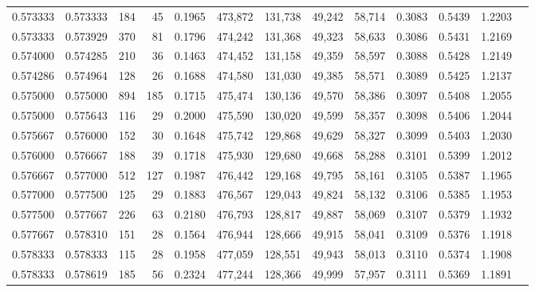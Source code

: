 \begin{tabular}{rrrrrrrrrrrrr}
0.573333 & 0.573333 &   184 &  45 &                                     0.1965 & 473,872 & 131,738 &  49,242 &  58,714 & 0.3083 & 0.5439 & 1.2203 \\
0.573333 & 0.573929 &   370 &  81 &                                     0.1796 & 474,242 & 131,368 &  49,323 &  58,633 & 0.3086 & 0.5431 & 1.2169 \\
0.574000 & 0.574285 &   210 &  36 &                                     0.1463 & 474,452 & 131,158 &  49,359 &  58,597 & 0.3088 & 0.5428 & 1.2149 \\
0.574286 & 0.574964 &   128 &  26 &                                     0.1688 & 474,580 & 131,030 &  49,385 &  58,571 & 0.3089 & 0.5425 & 1.2137 \\
0.575000 & 0.575000 &   894 & 185 &                                     0.1715 & 475,474 & 130,136 &  49,570 &  58,386 & 0.3097 & 0.5408 & 1.2055 \\
0.575000 & 0.575643 &   116 &  29 &                                     0.2000 & 475,590 & 130,020 &  49,599 &  58,357 & 0.3098 & 0.5406 & 1.2044 \\
0.575667 & 0.576000 &   152 &  30 &                                     0.1648 & 475,742 & 129,868 &  49,629 &  58,327 & 0.3099 & 0.5403 & 1.2030 \\
0.576000 & 0.576667 &   188 &  39 &                                     0.1718 & 475,930 & 129,680 &  49,668 &  58,288 & 0.3101 & 0.5399 & 1.2012 \\
0.576667 & 0.577000 &   512 & 127 &                                     0.1987 & 476,442 & 129,168 &  49,795 &  58,161 & 0.3105 & 0.5387 & 1.1965 \\
0.577000 & 0.577500 &   125 &  29 &                                     0.1883 & 476,567 & 129,043 &  49,824 &  58,132 & 0.3106 & 0.5385 & 1.1953 \\
0.577500 & 0.577667 &   226 &  63 &                                     0.2180 & 476,793 & 128,817 &  49,887 &  58,069 & 0.3107 & 0.5379 & 1.1932 \\
0.577667 & 0.578310 &   151 &  28 &                                     0.1564 & 476,944 & 128,666 &  49,915 &  58,041 & 0.3109 & 0.5376 & 1.1918 \\
0.578333 & 0.578333 &   115 &  28 &                                     0.1958 & 477,059 & 128,551 &  49,943 &  58,013 & 0.3110 & 0.5374 & 1.1908 \\
0.578333 & 0.578619 &   185 &  56 &                                     0.2324 & 477,244 & 128,366 &  49,999 &  57,957 & 0.3111 & 0.5369 & 1.1891 \\

\end{tabular}
